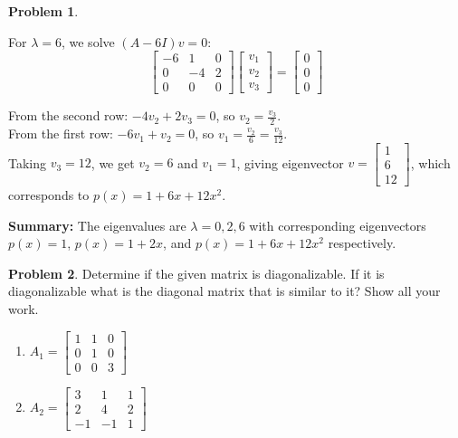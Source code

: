 \documentclass[12pt, oneside]{amsart}
\theoremstyle{definition}
\newtheorem{prob}{Problem}
\begin{document}
\begin{prob}
\begin{solution}
For $\lambda = 6$, we solve $(A - 6I)v = 0$:
\[
\begin{bmatrix} -6 & 1 & 0 \\ 0 & -4 & 2 \\ 0 & 0 & 0 \end{bmatrix} \begin{bmatrix} v_1 \\ v_2 \\ v_3 \end{bmatrix} = \begin{bmatrix} 0 \\ 0 \\ 0 \end{bmatrix}
\]

From the second row: $-4v_2 + 2v_3 = 0$, so $v_2 = \frac{v_3}{2}$.\\
From the first row: $-6v_1 + v_2 = 0$, so $v_1 = \frac{v_2}{6} = \frac{v_3}{12}$.\\
Taking $v_3 = 12$, we get $v_2 = 6$ and $v_1 = 1$, giving eigenvector $v = \begin{bmatrix} 1 \\ 6 \\ 12 \end{bmatrix}$, which corresponds to $p(x) = 1 + 6x + 12x^2$.

\textbf{Summary:} The eigenvalues are $\lambda = 0, 2, 6$ with corresponding eigenvectors $p(x) = 1$, $p(x) = 1 + 2x$, and $p(x) = 1 + 6x + 12x^2$ respectively.
    
    \end{solution}
\end{prob}

\begin{prob}
    Determine if the given matrix is diagonalizable. If it is diagonalizable what is the diagonal matrix that is similar to it? Show all your work.
    \begin{enumerate}
        \item $A_1 = \left[\begin{matrix} 1 & 1 & 0 \\ 0 & 1 & 0 \\ 0 & 0 & 3\end{matrix}\right]$

        \item $A_2 = \left[\begin{matrix} 3 & 1 & 1 \\ 2 & 4 & 2 \\ -1 & -1 & 1\end{matrix}\right]$
    \end{enumerate}
\end{prob}
\end{document}
